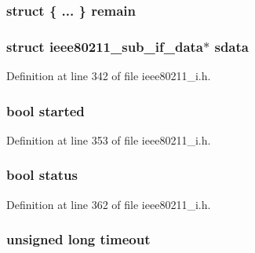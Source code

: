 \hypertarget{structieee80211__work_a848f56cbf44ec6114e7da4547b616fb1}{
\subsubsection[{remain}]{\setlength{\rightskip}{0pt plus 5cm}struct \{ ... \}   remain}}\label{structieee80211__work_a848f56cbf44ec6114e7da4547b616fb1}
\hypertarget{structieee80211__work_ad829d8d33f06a7245cc303f924f259ac}{
\subsubsection[{sdata}]{\setlength{\rightskip}{0pt plus 5cm}struct {\bf ieee80211\-\_\-sub\-\_\-if\-\_\-data}$\ast$ sdata}}\label{structieee80211__work_ad829d8d33f06a7245cc303f924f259ac}


Definition at line 342 of file ieee80211\-\_\-i.\-h.

\hypertarget{structieee80211__work_a43c08d193d555a2b2a61c53d2a4e5a63}{
\subsubsection[{started}]{\setlength{\rightskip}{0pt plus 5cm}bool started}}\label{structieee80211__work_a43c08d193d555a2b2a61c53d2a4e5a63}


Definition at line 353 of file ieee80211\-\_\-i.\-h.

\hypertarget{structieee80211__work_ad1f0bff7112206922c9d5a87adad6f2b}{
\subsubsection[{status}]{\setlength{\rightskip}{0pt plus 5cm}bool status}}\label{structieee80211__work_ad1f0bff7112206922c9d5a87adad6f2b}


Definition at line 362 of file ieee80211\-\_\-i.\-h.

\hypertarget{structieee80211__work_a639e65bbd749de17060d658eb233f72b}{
\subsubsection[{timeout}]{\setlength{\rightskip}{0pt plus 5cm}unsigned long timeout}}\label{structieee80211__work_a639e65bbd749de17060d658eb233f72b}


